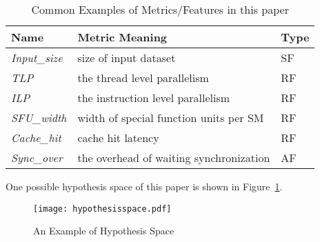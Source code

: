 \begin{table}[!t]
\small
\caption{Common Examples of Metrics/Features in this paper} 
\begin{tabular}{ l | l | l }
\hline
\textbf{Name} & \textbf{Metric Meaning} & \textbf{Type} \\
\hline
\textit{Input\_size} & size of input dataset & SF\\
\hline
\textit{TLP} & the thread level parallelism & RF \\
 \hline
\textit{ILP} & the instruction level parallelism & RF \\
\hline
\textit{SFU\_width} & width of special function units per SM & RF \\
\hline
\textit{Cache\_hit} & cache hit latency & RF \\
\hline
\textit{Sync\_over} & the overhead of waiting synchronization & AF \\
\hline
\end{tabular}
\label{table:metrics}
\end{table}



One possible hypothesis space of this paper is shown in Figure~\ref{fig:hs}.

\begin{figure}[!t]
\centering
\texttt{[image: hypothesisspace.pdf]}
\caption{An Example of Hypothesis Space}
\label{fig:hs}
\end{figure}

